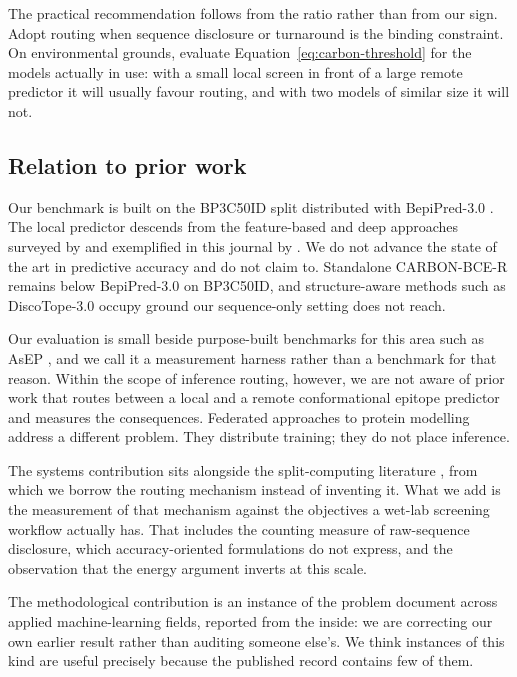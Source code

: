 The practical recommendation follows from the ratio rather than from our sign.
Adopt routing when sequence disclosure or turnaround is the binding
constraint. On environmental grounds, evaluate
Equation~\ref{eq:carbon-threshold} for the models actually in use: with a
small local screen in front of a large remote predictor it will usually
favour routing, and with two models of similar size it will not.

\subsection{Relation to prior work}

Our benchmark is built on the BP3C50ID split distributed with BepiPred-3.0
\citep{clifford2022bepipred}. The local predictor descends from the
feature-based and deep approaches surveyed by \citet{cia2023critical} and
exemplified in this journal by \citet{attique2023deepbce}. We do not advance the
state of the art in predictive accuracy and do not claim to. Standalone
CARBON-BCE-R remains below BepiPred-3.0 on BP3C50ID, and structure-aware methods
such as DiscoTope-3.0 \citep{hoie2024discotope} occupy ground our sequence-only
setting does not reach.

Our evaluation is small beside purpose-built benchmarks for this area such as
AsEP \citep{liu2024asep}, and we call it a measurement harness rather than a
benchmark for that reason. Within the scope of inference routing, however, we
are not aware of prior work that routes between a local and a remote
conformational epitope predictor and measures the consequences. Federated
approaches to protein modelling address a different problem. They distribute
training; they do not place inference.

The systems contribution sits alongside the split-computing literature
\citep{matsubara2022split}, from which we borrow the routing mechanism instead
of inventing it. What we add is the measurement of that mechanism against the
objectives a wet-lab screening workflow actually has. That includes the
counting measure of raw-sequence disclosure, which accuracy-oriented
formulations do not express, and the observation that the energy argument
inverts at this scale.

The methodological contribution is an instance of the problem
\citet{kapoor2023leakage} document across applied machine-learning fields,
reported from the inside: we are correcting our own earlier result rather than
auditing someone else's. We think instances of this kind are useful precisely
because the published record contains few of them.
